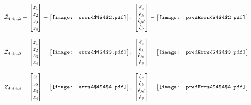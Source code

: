 \documentclass[12pt]{article}
\begin{document}
\begin{gather*}
\bar{\mathcal{Z}}_{4,4,4,2}=\begin{bmatrix}
z_1\\
z_2\\
z_3\\
z_4
 \end{bmatrix}= \begin{bmatrix}
\vcenter{\hbox{\texttt{[image: errs4\$4\$4\$2.pdf]}}}
 \end{bmatrix},\,\, \begin{bmatrix}
\hat{\epsilon}_c\\\hat{\epsilon}_k\\\hat{\epsilon}_\mathcal{N}\\\hat{\epsilon}_\theta
 \end{bmatrix}=\begin{bmatrix}
\vcenter{\hbox{\texttt{[image: predErrs4\$4\$4\$2.pdf]}}}
 \end{bmatrix}
\end{gather*}


\begin{gather*}
\bar{\mathcal{Z}}_{4,4,4,3}=\begin{bmatrix}
z_1\\
z_2\\
z_3\\
z_4
 \end{bmatrix}= \begin{bmatrix}
\vcenter{\hbox{\texttt{[image: errs4\$4\$4\$3.pdf]}}}
 \end{bmatrix},\,\, \begin{bmatrix}
\hat{\epsilon}_c\\\hat{\epsilon}_k\\\hat{\epsilon}_\mathcal{N}\\\hat{\epsilon}_\theta
 \end{bmatrix}=\begin{bmatrix}
\vcenter{\hbox{\texttt{[image: predErrs4\$4\$4\$3.pdf]}}}
 \end{bmatrix}
\end{gather*}


\begin{gather*}
\bar{\mathcal{Z}}_{4,4,4,4}=\begin{bmatrix}
z_1\\
z_2\\
z_3\\
z_4
 \end{bmatrix}= \begin{bmatrix}
\vcenter{\hbox{\texttt{[image: errs4\$4\$4\$4.pdf]}}}
 \end{bmatrix},\,\, \begin{bmatrix}
\hat{\epsilon}_c\\\hat{\epsilon}_k\\\hat{\epsilon}_\mathcal{N}\\\hat{\epsilon}_\theta
 \end{bmatrix}=\begin{bmatrix}
\vcenter{\hbox{\texttt{[image: predErrs4\$4\$4\$4.pdf]}}}
 \end{bmatrix}
\end{gather*}
\end{document}
